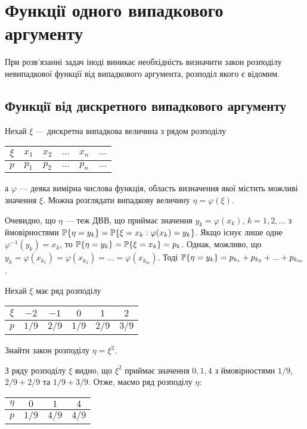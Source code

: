 
\section{Функції одного випадкового аргументу}
При розв'язанні задач іноді виникає необхідність визначити закон розподілу невипадкової функції від випадкового аргумента,
розподіл якого є відомим.
\subsection{Функції від дискретного випадкового аргументу}
Нехай $\xi$ --- дискретна випадкова величина з рядом розподілу 
\begin{center}
    \begin{tabular}{|c|c|c|c|c|c|}
        \hline
        $\xi$ & $x_1$ & $x_2$ & $...$ & $x_n$ & $...$ \\
        \hline
        $p$ & $p_1$ & $p_2$ & $...$ & $p_n$ & $...$ \\
        \hline
    \end{tabular}    
\end{center}
а $\varphi$ --- деяка вимірна числова функція, 
область визначення якої містить можливі значення $\xi$.
Можна розглядати випадкову величину $\eta = \varphi(\xi)$.

Очевидно, що $\eta$ --- теж ДВВ, що приймає значення $y_k = \varphi(x_k)$, 
$k = 1, 2, ...$ з ймовірностями $\P\{\eta = y_k\} = \P\{\xi = x_k : \varphi(x_k) = y_k\}$.
Якщо існує лише одне $\varphi^{-1} (y_k) = x_k$, то $\P\{\eta = y_k\} = \P\{\xi = x_k\} = p_k$.
Однак, можливо, що $y_k = \varphi(x_{k_1}) = \varphi(x_{k_2}) = ... = \varphi(x_{k_m})$.
Тоді $\P\{\eta = y_k\} = p_{k_1} + p_{k_2} + ... + p_{k_m}$.

\begin{example}
    Нехай $\xi$ має ряд розподілу
    \begin{center}
        \begin{tabular}{|c|c|c|c|c|c|}
            \hline
            $\xi$ & $-2$ & $-1$ & $0$ & $1$ & $2$ \\
            \hline
            $p$ & $1/9$ & $2/9$ & $1/9$ & $2/9$ & $3/9$ \\
            \hline
        \end{tabular}
    \end{center}
    Знайти закон розподілу $\eta = \xi^2$.
    
    З ряду розподілу $\xi$ видно, що $\xi^2$ приймає значення $0, 1, 4$ з
    ймовірностями $1/9$, $2/9 + 2/9$ та $1/9 + 3/9$.
    Отже, маємо ряд розподілу $\eta$: 
    \begin{center}
        \begin{tabular}{|c|c|c|c|}
            \hline
            $\eta$ & $0$ & $1$ & $4$ \\
            \hline
            $p$ & $1/9$ & $4/9$ & $4/9$ \\
            \hline
        \end{tabular}
    \end{center}
\end{example}

